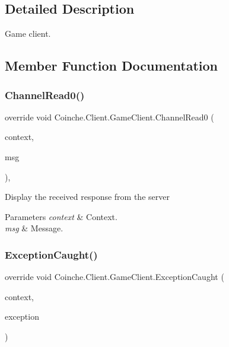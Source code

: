 \subsection{Detailed Description}
Game client. 



\subsection{Member Function Documentation}
\mbox{\label{class_coinche_1_1_client_1_1_game_client_a706d011a63f1277147e75475ff6a7d25}} 
\subsubsection{\texorpdfstring{Channel\+Read0()}{ChannelRead0()}}
{\footnotesize\ttfamily override void Coinche.\+Client.\+Game\+Client.\+Channel\+Read0 (\begin{DoxyParamCaption}\item[{I\+Channel\+Handler\+Context}]{context,  }\item[{\hyperlink{class_coinche_1_1_google_1_1_protobuf_1_1_game_response}{Game\+Response}}]{msg }\end{DoxyParamCaption})\hspace{0.3cm}{\ttfamily [inline]}, {\ttfamily [protected]}}



Display the received response from the server 


\begin{DoxyParams}{Parameters}
{\em context} & Context.\\
\hline
{\em msg} & Message.\\
\hline
\end{DoxyParams}
\mbox{\label{class_coinche_1_1_client_1_1_game_client_a5764c84f4c58919f3ff21c874455509b}} 
\subsubsection{\texorpdfstring{Exception\+Caught()}{ExceptionCaught()}}
{\footnotesize\ttfamily override void Coinche.\+Client.\+Game\+Client.\+Exception\+Caught (\begin{DoxyParamCaption}\item[{I\+Channel\+Handler\+Context}]{context,  }\item[{Exception}]{exception }\end{DoxyParamCaption})\hspace{0.3cm}{\ttfamily [inline]}}



